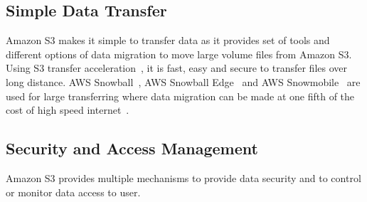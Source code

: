 \subsection{Simple Data Transfer} 

Amazon S3 makes it simple to transfer data as it provides set of tools
and different options of data migration to move large volume files
from Amazon S3.  Using S3 transfer
acceleration~\cite{hid-sp18-420-amazon-S3-dataTransfer-FAQ}, it is
fast, easy and secure to transfer files over long distance. AWS
Snowball~\cite{hid-sp18-420-amazon-snowball}, AWS Snowball
Edge~\cite{hid-sp18-420-amazon-snowball-edge} and AWS
Snowmobile~\cite{hid-sp18-420-amazon-snowmobile} are used for large
transferring where data migration can be made at one fifth of the cost
of high speed internet~\cite{hid-sp18-420-amazon-S3-cloud-migration}.

\subsection{Security and Access Management} 

Amazon S3 provides multiple mechanisms to provide data security and to
control or monitor data access to user.


